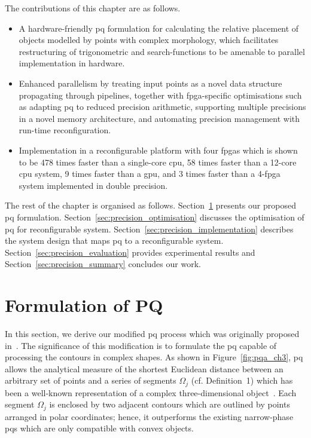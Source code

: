 The contributions of this chapter are as follows.
\begin{itemize}
\item A hardware-friendly \gls{pq} formulation for calculating the relative placement of objects modelled by points with complex morphology, which facilitates
restructuring of trigonometric and search-functions to be amenable to parallel implementation in hardware.
\item Enhanced parallelism by treating input points as a novel data structure propagating through pipelines, 
together with \gls{fpga}-specific optimisations such as adapting \gls{pq} to reduced precision arithmetic,
supporting multiple precisions in a novel memory architecture, and automating precision management with run-time reconfiguration.
\item Implementation in a reconfigurable platform with four \gls{fpga}s which is shown to be 478 times faster than a single-core \gls{cpu}, 58 times faster than a 12-core \gls{cpu} system, 9 times faster than a \gls{gpu}, and 3 times faster than a 4-\gls{fpga} system implemented in double precision.
\end{itemize}

The rest of the chapter is organised as follows.
Section~\ref{sec:precision_formulation} presents our proposed \gls{pq} formulation.
Section~\ref{sec:precision_optimisation} discusses the optimisation of \gls{pq} for reconfigurable system.
Section~\ref{sec:precision_implementation} describes the system design that maps \gls{pq} to a reconfigurable system.
Section~\ref{sec:precision_evaluation} provides experimental results and
Section~\ref{sec:precision_summary} concludes our work.

\section{Formulation of PQ}
\label{sec:precision_formulation}

In this section, we derive our modified \gls{pq} process which was originally proposed in~\cite{kwok13}. 
The significance of this modification is to formulate the \gls{pq} capable of processing the contours in complex shapes. 
As shown in Figure~\ref{fig:pqa_ch3}, \gls{pq} allows the analytical measure of the shortest Euclidean distance between an arbitrary set of points and a series of segments $\Omega_j$ (cf. Definition~1) which has been a well-known representation of a complex three-dimensional object~\cite{ponce89}. 
Each segment $\Omega_j$ is enclosed by two adjacent contours which are outlined by points arranged in polar coordinates; 
hence, it outperforms the existing narrow-phase \gls{pq}s which are only compatible with convex objects.

